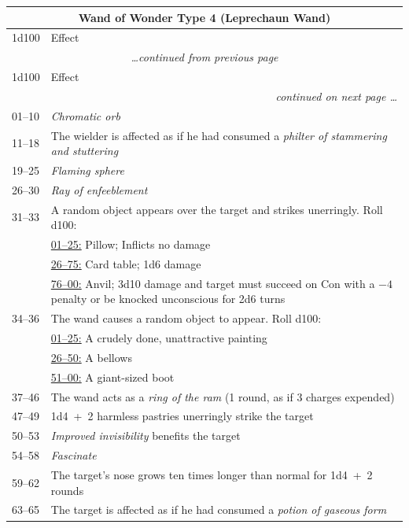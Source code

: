 \noindent \begin{longtable}{|p{}|p{}|}
\multicolumn{2}{c}{Wand of Wonder Type 4 (Leprechaun Wand)} \\
\hline
1d100	& Effect \\
\hline\hline
\endfirsthead
\multicolumn{2}{c}{\textit{\ldots continued from previous page}} \\
\hline
1d100	& Effect \\
\hline\hline
\endhead
\hline
\multicolumn{2}{r}{\textit{continued on next page \ldots}}\\
\endfoot
\hline
\endlastfoot
\rowcolor[gray]{.9}01--10	& \textit{Chromatic orb} \\
11--18	& The wielder is affected as if he had consumed a \textit{philter of stammering and stuttering} \\
\rowcolor[gray]{.9}19--25	& \textit{Flaming sphere} \\
26--30	& \textit{Ray of enfeeblement} \\
\rowcolor[gray]{.9}31--33	& A random object appears over the target and strikes unerringly.  Roll d100: \\
\rowcolor[gray]{.9}		& \underline{01--25:} Pillow; Inflicts no damage \\
\rowcolor[gray]{.9}		& \underline{26--75:} Card table; 1d6 damage \\
\rowcolor[gray]{.9}		& \underline{76--00:} Anvil; 3d10 damage and target must succeed on Con with a $-4$ penalty or be knocked unconscious for 2d6 turns \\
34--36	& The wand causes a random object to appear.  Roll d100: \\
		& \underline{01--25:} A crudely done, unattractive painting \\
		& \underline{26--50:} A bellows \\
		& \underline{51--00:} A giant-sized boot \\
\rowcolor[gray]{.9}37--46	& The wand acts as a \textit{ring of the ram} (1 round, as if 3 charges expended) \\
47--49	& 1d4~+~2 harmless pastries unerringly strike the target \\
\rowcolor[gray]{.9}50--53	& \textit{Improved invisibility} benefits the target \\
54--58	& \textit{Fascinate} \\
\rowcolor[gray]{.9}59--62	& The target's nose grows ten times longer than normal for 1d4~+~2 rounds \\
63--65	& The target is affected as if he had consumed a \textit{potion of gaseous form} \\

\end{longtable}
